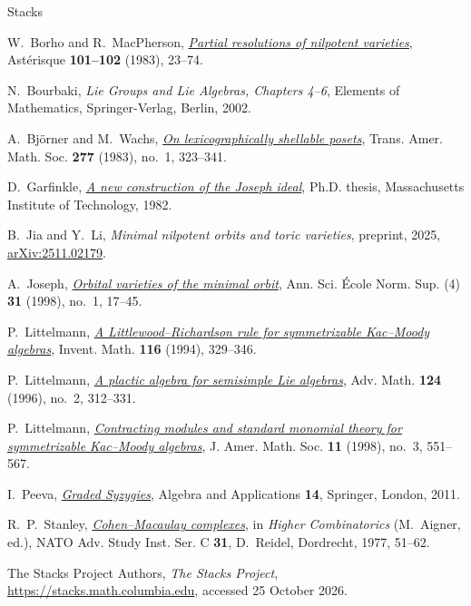 \documentclass[12pt]{article}
\theoremstyle{definition}
\begin{document}
\begin{thebibliography}{Stacks}

    W.~Borho and R.~MacPherson,
    \href{https://www.numdam.org/item/AST_1983__101-102__23_0/}{\emph{Partial resolutions of nilpotent varieties}},
    Ast\'erisque \textbf{101--102} (1983), 23--74.

    N.~Bourbaki,
    \emph{Lie Groups and Lie Algebras, Chapters 4--6},
    Elements of Mathematics, Springer-Verlag, Berlin, 2002.

    A.~Bj\"orner and M.~Wachs,
    \href{https://doi.org/10.1090/S0002-9947-1983-0690055-6}{\emph{On lexicographically shellable posets}},
    Trans. Amer. Math. Soc. \textbf{277} (1983), no.~1, 323--341.

    D.~Garfinkle,
    \href{https://hdl.handle.net/1721.1/15620}{\emph{A new construction of the Joseph ideal}},
    Ph.D. thesis, Massachusetts Institute of Technology, 1982.

    B.~Jia and Y.~Li,
    \emph{Minimal nilpotent orbits and toric varieties},
    preprint, 2025,
    \href{https://arxiv.org/abs/2511.02179}{arXiv:2511.02179}.

    A.~Joseph,
    \href{https://doi.org/10.1016/S0012-9593(98)80017-7}{\emph{Orbital varieties of the minimal orbit}},
    Ann. Sci. \'{E}cole Norm. Sup. (4) \textbf{31} (1998), no.~1, 17--45.

    P.~Littelmann,
    \href{https://doi.org/10.1007/BF01231564}{\emph{A Littlewood--Richardson rule for symmetrizable Kac--Moody algebras}},
    Invent. Math. \textbf{116} (1994), 329--346.

    P.~Littelmann,
    \href{https://doi.org/10.1006/aima.1996.0085}{\emph{A plactic algebra for semisimple Lie algebras}},
    Adv. Math. \textbf{124} (1996), no.~2, 312--331.

    P.~Littelmann,
    \href{https://doi.org/10.1090/S0894-0347-98-00268-9}{\emph{Contracting modules and standard monomial theory for symmetrizable Kac--Moody algebras}},
    J. Amer. Math. Soc. \textbf{11} (1998), no.~3, 551--567.

    I.~Peeva,
    \href{https://doi.org/10.1007/978-0-85729-177-6}{\emph{Graded Syzygies}},
    Algebra and Applications \textbf{14}, Springer, London, 2011.

    R.~P.~Stanley,
    \href{https://doi.org/10.1007/978-94-010-1220-1_3}{\emph{Cohen--Macaulay complexes}},
    in \emph{Higher Combinatorics} (M.~Aigner, ed.),
    NATO Adv. Study Inst. Ser. C \textbf{31}, D.~Reidel, Dordrecht, 1977, 51--62.

    The Stacks Project Authors,
    \emph{The Stacks Project},
    \url{https://stacks.math.columbia.edu}, accessed 25 October 2026.

\end{thebibliography}
\end{document}
